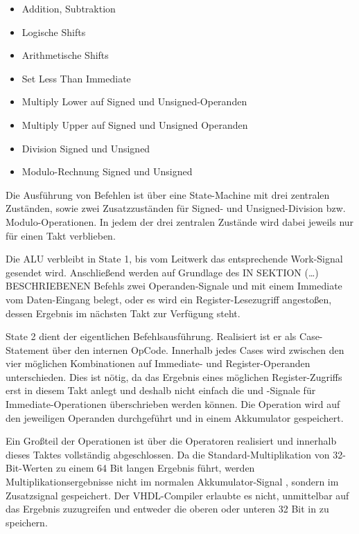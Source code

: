 \begin{itemize}
\item Addition, Subtraktion
\item Logische Shifts
\item Arithmetische Shifts
\item Set Less Than Immediate
\item Multiply Lower auf Signed und Unsigned-Operanden
\item Multiply Upper auf Signed und Unsigned Operanden
\item Division Signed und Unsigned
\item Modulo-Rechnung Signed und Unsigned
\end{itemize}

Die Ausf\"uhrung von Befehlen ist \"uber eine State-Machine mit drei zentralen Zuständen, sowie zwei Zusatzzuständen f\"ur Signed- und Unsigned-Division bzw. Modulo-Operationen. In jedem der drei zentralen Zustände wird dabei jeweils nur f\"ur einen Takt verblieben.

Die ALU verbleibt in State 1, bis vom Leitwerk das entsprechende Work-Signal gesendet wird.
Anschließend werden auf Grundlage des IN SEKTION (…) BESCHRIEBENEN Befehls zwei Operanden-Signale  und  mit einem Immediate vom Daten-Eingang belegt, oder es wird ein Register-Lesezugriff angestoßen, dessen Ergebnis im nächsten Takt zur Verf\"ugung steht.

State 2 dient der eigentlichen Befehlsausf\"uhrung. Realisiert ist er als Case-Statement \"uber den internen OpCode. Innerhalb jedes Cases wird zwischen den vier m\"oglichen Kombinationen auf Immediate- und Register-Operanden unterschieden.
Dies ist n\"otig, da das Ergebnis eines m\"oglichen Register-Zugriffs erst in diesem Takt anlegt und deshalb nicht einfach die  und -Signale f\"ur Immediate-Operationen \"uberschrieben werden k\"onnen.
Die Operation wird auf den jeweiligen Operanden durchgef\"uhrt und in einem Akkumulator gespeichert.\vspace{10}

Ein Großteil der Operationen ist \"uber die  Operatoren realisiert und innerhalb dieses Taktes vollständig abgeschlossen.
Da die Standard-Multiplikation von 32-Bit-Werten zu einem 64 Bit langen Ergebnis f\"uhrt, werden Multiplikationsergebnisse nicht im normalen Akkumulator-Signal , sondern im Zusatzsignal  gespeichert. Der VHDL-Compiler erlaubte es nicht, unmittelbar auf das Ergebnis zuzugreifen und entweder die oberen oder unteren 32 Bit in  zu speichern.\vspace{10}

